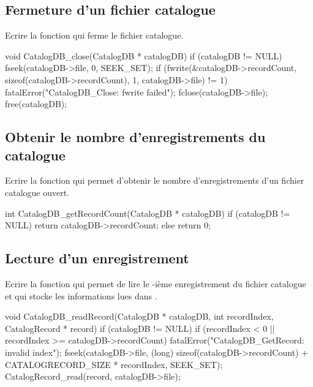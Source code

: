 \subsection{Fermeture d'un fichier catalogue}

Ecrire la fonction  qui ferme le fichier catalogue.
 
\begin{csourcecorrection}
void CatalogDB_close(CatalogDB * catalogDB) {
    if (catalogDB != NULL) {
        fseek(catalogDB->file, 0, SEEK_SET);
        if (fwrite(&catalogDB->recordCount, sizeof(catalogDB->recordCount), 1, catalogDB->file)
                != 1)
            fatalError("CatalogDB_Close: fwrite failed");
        fclose(catalogDB->file);
        free(catalogDB);
    }
}
\end{csourcecorrection}

\subsection{Obtenir le nombre d'enregistrements du catalogue}

Ecrire la fonction  qui permet d'obtenir le nombre d'enregistrements d'un fichier catalogue ouvert.

\begin{csourcecorrection}
int CatalogDB_getRecordCount(CatalogDB * catalogDB) {
    if (catalogDB != NULL)
        return catalogDB->recordCount;
    else
        return 0;
}
\end{csourcecorrection}

\subsection{Lecture d'un enregistrement}

Ecrire la fonction  qui permet de lire le -ième enregistrement du fichier catalogue et qui stocke les informations lues dans .

\begin{csourcecorrection}
void CatalogDB_readRecord(CatalogDB * catalogDB, int recordIndex, CatalogRecord * record) {
    if (catalogDB != NULL) {
        if (recordIndex < 0 || recordIndex >= catalogDB->recordCount)
            fatalError("CatalogDB_GetRecord: invalid index");
        fseek(catalogDB->file, (long) sizeof(catalogDB->recordCount) + CATALOGRECORD_SIZE
                * recordIndex, SEEK_SET);
        CatalogRecord_read(record, catalogDB->file);
    }
}
\end{csourcecorrection}


